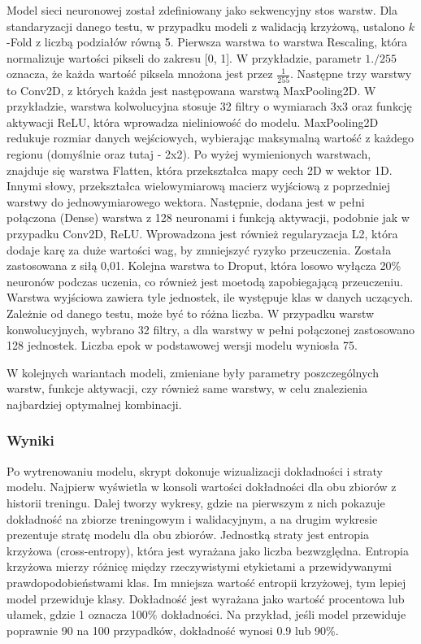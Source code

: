 Model sieci neuronowej został zdefiniowany jako sekwencyjny stos warstw.
Dla standaryzacji danego testu, w przypadku modeli z walidacją krzyżową, ustalono $k$-Fold z liczbą podziałów równą 5.
Pierwsza warstwa to warstwa Rescaling, która normalizuje wartości pikseli do zakresu [0, 1].
W przykładzie, parametr $1./255$ oznacza, że każda wartość piksela mnożona jest przez $\frac{1}{255}$.
Następne trzy warstwy to Conv2D, z których każda jest następowana warstwą MaxPooling2D.
W przykładzie, warstwa kolwolucyjna stosuje 32 filtry o wymiarach 3x3 oraz funkcję aktywacji ReLU,
która wprowadza nieliniowość do modelu.
MaxPooling2D redukuje rozmiar danych wejściowych,
wybierając maksymalną wartość z każdego regionu (domyślnie oraz tutaj - 2x2). 
Po wyżej wymienionych warstwach, znajduje się warstwa Flatten, która przekształca mapy cech 2D w wektor 1D.
Innymi słowy, przekształca wielowymiarową macierz wyjściową z poprzedniej warstwy do jednowymiarowego wektora.
Następnie, dodana jest w pełni połączona (Dense) warstwa z 128 neuronami
i funkcją aktywacji, podobnie jak w przypadku Conv2D, ReLU.
Wprowadzona jest również regularyzacja L2, która dodaje karę za duże wartości wag,
by zmniejszyć ryzyko przeuczenia. Została zastosowana z siłą 0,01.
Kolejna warstwa to Droput, która losowo wyłącza 20\% neuronów podczas uczenia,
co również jest moetodą zapobiegającą przeuczeniu.
Warstwa wyjściowa zawiera tyle jednostek, ile występuje klas w danych uczących.
Zależnie od danego testu, może być to różna liczba.
W przypadku warstw konwolucyjnych, wybrano 32 filtry, a dla warstwy w pełni połączonej zastosowano 128 jednostek.
Liczba epok w podstawowej wersji modelu wyniosła 75.

W kolejnych wariantach modeli, zmieniane były parametry poszczególnych warstw, funkcje aktywacji,
czy również same warstwy, w celu znalezienia najbardziej optymalnej kombinacji.

\subsubsection{Wyniki}
Po wytrenowaniu modelu, skrypt dokonuje wizualizacji dokładności i straty modelu.
Najpierw wyświetla w konsoli wartości dokładności dla obu zbiorów z historii treningu.
Dalej tworzy wykresy, gdzie na pierwszym z nich pokazuje dokładność na zbiorze treningowym i walidacyjnym,
a na drugim wykresie prezentuje stratę modelu dla obu zbiorów.
Jednostką straty jest entropia krzyżowa (cross-entropy), która jest wyrażana jako liczba bezwzględna.
Entropia krzyżowa mierzy różnicę między rzeczywistymi etykietami a przewidywanymi prawdopodobieństwami klas.
Im mniejsza wartość entropii krzyżowej, tym lepiej model przewiduje klasy.
Dokładność jest wyrażana jako wartość procentowa lub ułamek, gdzie 1 oznacza 100\% dokładności.
Na przykład, jeśli model przewiduje poprawnie 90 na 100 przypadków, dokładność wynosi 0.9 lub 90\%.

